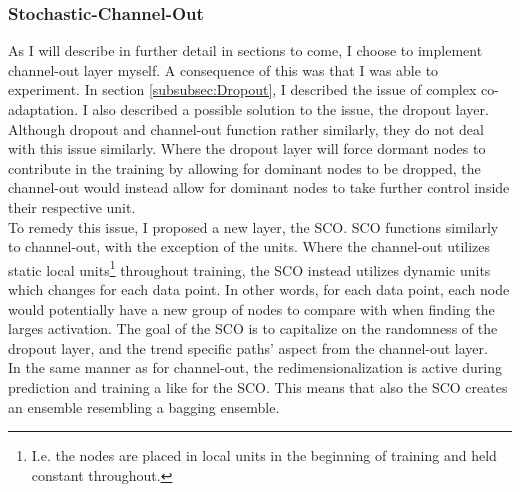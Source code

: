 \subsubsection*{Stochastic-Channel-Out}\label{subsubsec:stochchannelout}
As I will describe in further detail in sections to come, I choose to implement channel-out layer myself. A consequence of this 
was that I was able to experiment. In section \ref{subsubsec:Dropout}, I described the issue of complex co-adaptation. I also described 
a possible solution to the issue, the dropout layer. Although dropout and channel-out function rather similarly, they do not deal 
with this issue similarly. Where the dropout layer will force dormant nodes to contribute in the training by allowing for dominant
nodes to be dropped, the channel-out would instead allow for dominant nodes to take further control inside their respective unit.
\\
To remedy this issue, I proposed a new layer, the \acf{SCO}. \ac{SCO} functions similarly to channel-out, with the exception of 
the units. Where the channel-out utilizes static local units\footnote{I.e. the nodes are placed in local units in the beginning of training 
and held constant throughout.} throughout training, the \ac{SCO} instead utilizes dynamic units which changes for each data point. In other words, 
for each data point, each node would potentially have a new group of nodes to compare with when finding the larges activation.
The goal of the \ac{SCO} is to capitalize on the randomness of the dropout layer, and the trend specific paths' aspect from the 
channel-out layer.
\\  
In the same manner as for channel-out, the redimensionalization is active during prediction and training a like for the \ac{SCO}. This 
means that also the \ac{SCO} creates an ensemble resembling a bagging ensemble.
